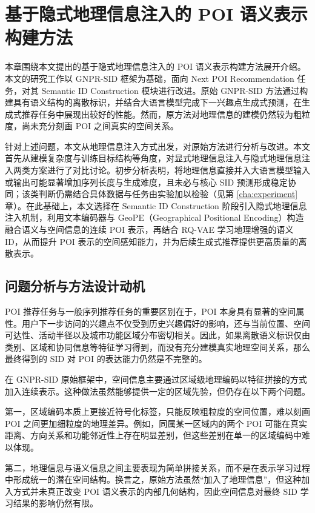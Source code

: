 \chapter{基于隐式地理信息注入的 POI 语义表示构建方法}
\label{cha:method}

本章围绕本文提出的基于隐式地理信息注入的 POI 语义表示构建方法展开介绍。本文的研究工作以 GNPR-SID 框架为基础，面向 Next POI Recommendation 任务，对其 Semantic ID Construction 模块进行改进。原始 GNPR-SID 方法通过构建具有语义结构的离散标识，并结合大语言模型完成下一兴趣点生成式预测，在生成式推荐任务中展现出较好的性能。然而，原方法对地理信息的建模仍然较为粗粒度，尚未充分刻画 POI 之间真实的空间关系。

针对上述问题，本文从地理信息注入方式出发，对原始方法进行分析与改进。本文首先从建模复杂度与训练目标结构等角度，对显式地理信息注入与隐式地理信息注入两类方案进行了对比讨论。初步分析表明，将地理信息直接并入大语言模型输入或输出可能显著增加序列长度与生成难度，且未必与核心 SID 预测形成稳定协同；该类判断仍需结合具体数据与任务由实验加以检验（见第 \ref{cha:experiment} 章）。在此基础上，本文选择在 Semantic ID Construction 阶段引入隐式地理信息注入机制，利用文本编码器与 GeoPE（Geographical Positional Encoding）构造融合语义与空间信息的连续 POI 表示，再结合 RQ-VAE 学习地理增强的语义 ID，从而提升 POI 表示的空间感知能力，并为后续生成式推荐提供更高质量的离散表示。

\section{问题分析与方法设计动机}
\label{sec:problem_analysis}

POI 推荐任务与一般序列推荐任务的重要区别在于，POI 本身具有显著的空间属性。用户下一步访问的兴趣点不仅受到历史兴趣偏好的影响，还与当前位置、空间可达性、活动半径以及城市功能区域分布密切相关。因此，如果离散语义标识仅由类别、区域和协同信息等特征学习得到，而没有充分建模真实地理空间关系，那么最终得到的 SID 对 POI 的表达能力仍然是不完整的。

在 GNPR-SID 原始框架中，空间信息主要通过区域级地理编码以特征拼接的方式加入连续表示。这种做法虽然能够提供一定的区域先验，但仍存在以下两个问题。

第一，区域编码本质上更接近符号化标签，只能反映粗粒度的空间位置，难以刻画 POI 之间更加细粒度的地理差异。例如，同属某一区域内的两个 POI 可能在真实距离、方向关系和功能邻近性上存在明显差别，但这些差别在单一的区域编码中难以体现。

第二，地理信息与语义信息之间主要表现为简单拼接关系，而不是在表示学习过程中形成统一的潜在空间结构。换言之，原始方法虽然“加入了地理信息”，但这种加入方式并未真正改变 POI 语义表示的内部几何结构，因此空间信息对最终 SID 学习结果的影响仍然有限。

